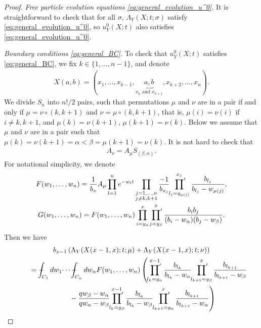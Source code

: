 \documentclass[pdftex]{sigma}
\numberwithin{equation}{section}
\def\Xint#1{\mathchoice
{\XXint\displaystyle\textstyle{#1}}%
{\XXint\textstyle\scriptstyle{#1}}%
{\XXint\scriptstyle\scriptscriptstyle{#1}}%
{\XXint\scriptscriptstyle\scriptscriptstyle{#1}}%
\!\int}
\def\XXint#1#2#3{{\setbox0=\hbox{$#1{#2#3}{\int}$}
\vcenter{\hbox{$#2#3$}}\kern-.5\wd0}}
\def\dashint{\Xint-}
\newcommand{\prodprime}{\sideset{}{'}\prod}
\begin{document}
\begin{proof}
\textit{Free particle evolution equations \eqref{eq:general_evolution_u^0}.}
 It is straightforward to check that for all $\sigma$, $\Lambda_Y(X; t; \sigma)$ satisfy \eqref{eq:general_evolution_u^0}, so $u^0_Y(X; t)$ also satisf\/ies \eqref{eq:general_evolution_u^0}.

\textit{Boundary conditions \eqref{eq:general_BC}.}
 To check that $u^0_Y(X; t)$ satisf\/ies \eqref{eq:general_BC}, we f\/ix $k \in \{ 1, \dotsc, n - 1 \}$, and denote
 \begin{gather*}
 X(a, b) = (x_1, \dotsc, x_{k - 1}, \!\!\underbrace{a, b}_{x_k \text{ and } x_{k + 1}}\!\! , x_{k + 2}, \dotsc, x_n).
 \end{gather*}
 We divide $S_n$ into $n!/2$ pairs, such that permutations $\mu$ and $\nu$ are in a pair if and only if $\mu = \nu \circ (k, k + 1)$ and $\nu = \mu \circ (k, k + 1)$, that is, $\mu(i) = \nu(i)$ if $i \neq k, k + 1$, and $\mu(k) = \nu(k + 1)$, $\mu(k + 1) = \nu(k)$. Below we assume that $\mu$ and $\nu$ are in a pair such that $\mu(k) = \nu(k + 1) = \alpha < \beta = \mu(k + 1) = \nu(k)$. It is not hard to check that
 \begin{gather*}
 A_{\nu} = A_{\mu} S_{(\beta, \alpha)}.
 \end{gather*}
 For notational simplicity, we denote
 \begin{gather*}
 F(w_1, \dotsc, w_n) =  \frac{1}{b_x} A_{\mu} \prod^n_{l = 1} e^{-w_l t} \prod_{\substack{j = 1, \dotsc, n \\ j \neq k, k + 1}} \frac{-1}{b_{x_j}} \prodprime^{x_j}_{l_j = y_{\mu(j)}} \frac{b_{l_j}}{b_{l_j} - w_{\mu(j)}}, \\
 G(w_1, \dotsc, w_n) =  F(w_1, \dotsc, w_n) \prod^x_{i = y_{\alpha}} \prodprime^x_{j = y_{\beta}} \frac{b_i b_j}{(b_i - w_{\alpha})(b_j - w_{\beta})}.
 \end{gather*}
 Then we have
 \begin{gather}
   b_{x - 1} \left( \Lambda_Y(X(x - 1, x); t; \mu) + \Lambda_Y(X(x - 1, x); t; \nu) \right)\nonumber \\
   \qquad{}
 =   \dashint_{C_1} dw_1 \dotsi \dashint_{C_n} dw_n F(w_1, \dotsc, w_n) \left( \prodprime^{x - 1}_{l_k = y_{\alpha}} \frac{b_{l_k}}{b_{l_k} - w_{\alpha}} \prodprime^x_{l_{k + 1} = y_{\beta}} \frac{b_{l_{k + 1}}}{b_{l_{k + 1}} - w_{\beta}} \right. \nonumber\\
\left. \qquad\quad{} - \frac{qw_{\beta} - w_{\alpha}}{qw_{\alpha} - w_{\beta}} \prodprime^{x - 1}_{l_k = y_{\beta}} \frac{b_{l_k}}{b_{l_k} - w_{\beta}} \prodprime^x_{l_{k + 1} = y_{\alpha}} \frac{b_{l_{k + 1}}}{b_{l_{k + 1}} - w_{\alpha}} \right) \nonumber\\

\end{gather}
\end{proof}
\end{document}
